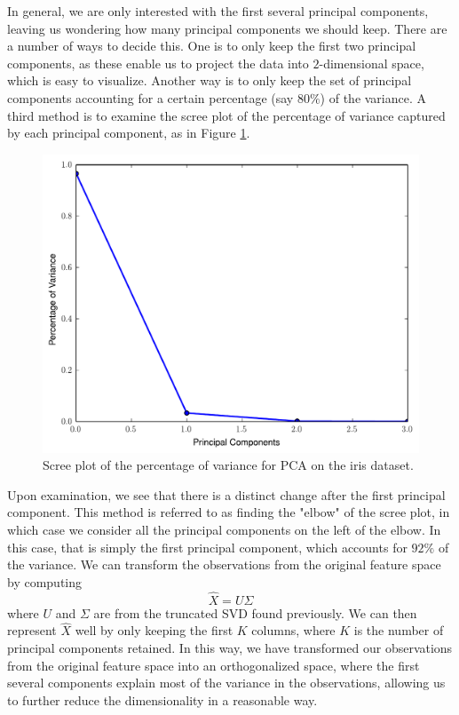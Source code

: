 In general, we are only interested with the first several principal components, leaving us wondering how many principal components we should keep. There are a number of ways to decide this. One is to only keep the first two principal components, as these enable us to project the data into $2$-dimensional space, which is easy to visualize. Another way is to only keep the set of principal components accounting for a certain percentage (say $80\%$) of the variance. A third method is to examine the scree plot of the percentage of variance captured by each principal component, as in Figure \ref{fig:iris_scree}.
\begin{figure}
\includegraphics[width=\textwidth]{iris_scree.pdf}
\caption{Scree plot of the percentage of variance for PCA on the iris dataset.}
\label{fig:iris_scree}
\end{figure}
Upon examination, we see that there is a distinct change after the first principal component. This method is referred to as finding the "elbow" of the scree plot, in which case we consider all the principal components on the left of the elbow. In this case, that is simply the first principal component, which accounts for $92\%$ of the variance.
We can transform the observations from the original feature space by computing
\begin{equation*}
\widehat{X} = U\Sigma
\end{equation*}
where $U$ and $\Sigma$ are from the truncated SVD found previously. We can then represent $\widehat{X}$ well by only keeping the first $K$ columns, where $K$ is the number of principal components retained. In this way, we have transformed our observations from the original feature space into an orthogonalized space, where the first several components explain most of the variance in the observations, allowing us to further reduce the dimensionality in a reasonable way.

